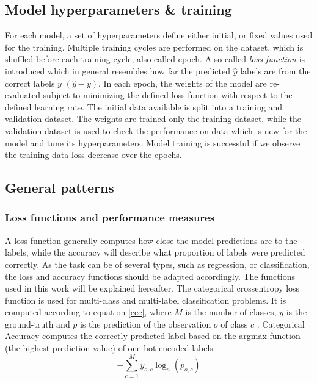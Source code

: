 
\subsection{Model hyperparameters \& training}
For each model, a set of hyperparameters define either initial, or fixed values used for the training. 
Multiple training cycles are performed on the dataset, which is shuffled before each training cycle, also called epoch. A so-called \emph{loss function} is introduced which in general resembles how far the predicted $\hat{y}$ labels are from the correct labels $y$ $(\hat{y} - y)$.
In each epoch, the weights of the model are re-evaluated subject to minimizing the defined loss-function with respect to the defined learning rate. The initial data available is split into a training and validation dataset. The weights are trained only the training dataset, while the validation dataset is used to check the performance on data which is new for the model and tune its hyperparameters. Model training is successful if we observe the training data loss decrease over the epochs. 


\subsection{General patterns}
\subsubsection{Loss functions and performance measures}
 A loss function generally computes how close the model predictions are to the labels, while the accuracy will describe what proportion of labels were predicted correctly. As the task can be of several types, such as regression, or classification, the loss and accuracy functions should be adapted accordingly. The functions used in this work will be explained hereafter.
The categorical crossentropy loss function is used for multi-class and multi-label classification problems. It is computed according to equation \ref{cce}, where $M$ is the number of classes, $y$ is the ground-truth and $p$ is the prediction of the observation $o$ of class $c$ \cite{noauthor_classical_nodate}. 
Categorical Accuracy computes the correctly predicted label based on the argmax function (the highest prediction value) of one-hot encoded labels.
\begin{equation}
\label{cce}
-\sum_{c=1}^My_{o,c}\log_{n}(p_{o,c})
\end{equation}


